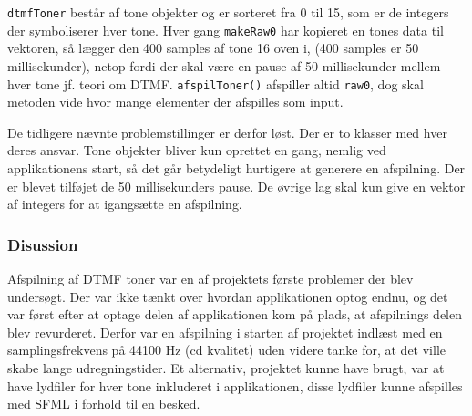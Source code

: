  \texttt{\textcolor{dkgreen}{dtmfToner}} består af tone objekter og er sorteret fra 0 til 15, som er de integers der symboliserer hver tone. Hver gang \texttt{makeRaw0} har kopieret en tones data til vektoren, så lægger den 400 samples af tone 16 oven i, (400 samples er 50 millisekunder), netop fordi der skal være en pause af 50 millisekunder mellem hver tone jf. teori om DTMF.
\newline
\texttt{afspilToner()} afspiller altid \texttt{\textcolor{dkgreen}{raw0}}, dog skal metoden vide hvor mange elementer der afspilles som input.
\hfill \break

De tidligere nævnte problemstillinger er derfor løst. Der er to klasser med hver deres ansvar. Tone objekter bliver kun oprettet en gang, nemlig ved applikationens start, så det går betydeligt hurtigere at generere en afspilning. Der er blevet tilføjet de 50 millisekunders pause. De øvrige lag skal kun give en vektor af integers for at igangsætte en afspilning.

\subsubsection{Disussion}
Afspilning af DTMF toner var en af projektets første problemer der blev undersøgt. Der var ikke tænkt over hvordan applikationen optog endnu, og det var først efter at optage delen af applikationen kom på plads, at afspilnings delen blev revurderet. Derfor var en afspilning i starten af projektet indlæst med en samplingsfrekvens på 44100 Hz (cd kvalitet) uden videre tanke for, at det ville skabe lange udregningstider. Et alternativ, projektet kunne have brugt, var at have lydfiler for hver tone inkluderet i applikationen, disse lydfiler kunne afspilles med SFML i forhold til en besked.